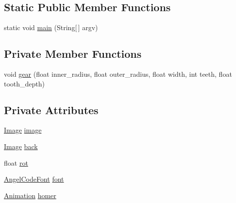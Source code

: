 \subsection*{Static Public Member Functions}
\begin{DoxyCompactItemize}
\item 
static void \mbox{\hyperlink{classorg_1_1newdawn_1_1slick_1_1tests_1_1_slick_callable_test_a2fec99c0773138e5b1de5b79fc37fa65}{main}} (String\mbox{[}$\,$\mbox{]} argv)
\end{DoxyCompactItemize}
\subsection*{Private Member Functions}
\begin{DoxyCompactItemize}
\item 
void \mbox{\hyperlink{classorg_1_1newdawn_1_1slick_1_1tests_1_1_slick_callable_test_a638b94eb5a18d4f59659783ab98db264}{gear}} (float inner\+\_\+radius, float outer\+\_\+radius, float width, int teeth, float tooth\+\_\+depth)
\end{DoxyCompactItemize}
\subsection*{Private Attributes}
\begin{DoxyCompactItemize}
\item 
\mbox{\hyperlink{classorg_1_1newdawn_1_1slick_1_1_image}{Image}} \mbox{\hyperlink{classorg_1_1newdawn_1_1slick_1_1tests_1_1_slick_callable_test_a32f74c606590f5fb810388651f838852}{image}}
\item 
\mbox{\hyperlink{classorg_1_1newdawn_1_1slick_1_1_image}{Image}} \mbox{\hyperlink{classorg_1_1newdawn_1_1slick_1_1tests_1_1_slick_callable_test_a8bde07ec49e362d281166d69996bc082}{back}}
\item 
float \mbox{\hyperlink{classorg_1_1newdawn_1_1slick_1_1tests_1_1_slick_callable_test_a5a8dc15fc39af58f212dd3f482f7a57f}{rot}}
\item 
\mbox{\hyperlink{classorg_1_1newdawn_1_1slick_1_1_angel_code_font}{Angel\+Code\+Font}} \mbox{\hyperlink{classorg_1_1newdawn_1_1slick_1_1tests_1_1_slick_callable_test_a0854b55fb448f5c331d07f464ca45652}{font}}
\item 
\mbox{\hyperlink{classorg_1_1newdawn_1_1slick_1_1_animation}{Animation}} \mbox{\hyperlink{classorg_1_1newdawn_1_1slick_1_1tests_1_1_slick_callable_test_a5bc881a4311acb2afd5467c4732290cf}{homer}}
\end{DoxyCompactItemize}
